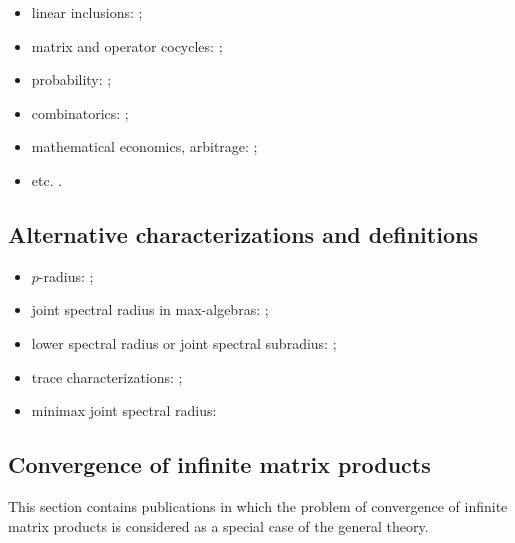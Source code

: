 \begin{itemize}
\item linear inclusions: \cite{ABMW:MTNS12, AJPR:IFACSRCD12, Bar:AIT88-3:e, Bar:AIT88-2:e, Bar:AIT88-5:e, Bar:ACC95, BarVin:LAA11, CheMam:BASRM04, DaiOp:AIT01:e, DHHX:JFI17, GurSam:CDC05, Gurv:LAA95, VEB:LAA00, Wirth:IJRNC98};
\item matrix and operator cocycles: \cite{BD:ArXiv18, DHX:ArXiv13-1, Morris:JFA12};
\item probability: \cite{ADFP:93, AltPar:CDC19, AltPar:SIAMJCO20, DHH:ArXiv14, KKV:CESA98, Li:IEEETAC11, Sert:CRMASP17};
\item combinatorics: \cite{BJ:CANT10, JPB:TCM09, MOS:GTS99, MOS:IEEETIT01, MOS:LAA07, Prot:SM00};
\item mathematical economics, arbitrage: \cite{CrossKPP:MECA12, CrossKoz:DCDSB13, KozCalPok:ArXiv10};
\item etc. \cite{BCK:AIP16, JPB:LNCS08, NP:SIAMJMAA20, Oreg-Reyes:GGD18, TO:ArXiv09, VladRub:JCA01}.
\end{itemize}

\subsection*{Alternative characterizations and definitions}
\begin{itemize}
\item $p$-radius: \cite{BhaBha:SM95, JP:CDC10, JunProt:SIAMJSC11, Morris:ArXiv19, OgurJung:CDC14, OgurMart:LAA14, OPJ:SCL16, Prot:LAA08, Prot:CDC05-2, Muller:APM97, Morris:AM16};
\item joint spectral radius in max-algebras: \cite{Bapat:LAA98, BGT:IEEETAC00, DGM:LIPICS17, Gaubert:IEEETAC95, GMW:LAA17, GurMas:LAA11, Lur:LAA05, Lur:LAA06-1, LurYang:LAA09, MulPep:LAA13, Pep:LAA08, Pep:LAA11};
\item lower spectral radius or joint spectral subradius: \cite{BochiMor:PLMS15, CJ:IJAMCS06, CJ:IJAMCS07, Czornik:LAA05, DekKui:JEMS11, JPB:TCM09, Jungers:LAA12};
\item trace characterizations: \cite{ChenZhou:LAA00, Xu:EJLA10};
\item minimax joint spectral radius: \cite{Koz:DCDSB19}
\end{itemize}

\subsection*{Convergence of infinite matrix products}
This section contains publications in which the problem of convergence of infinite matrix products is considered as a special case of the general theory.

